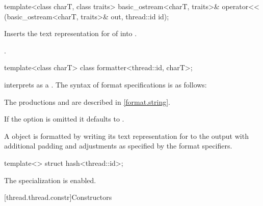 %
\begin{itemdecl}
template<class charT, class traits>
  basic_ostream<charT, traits>&
    operator<< (basic_ostream<charT, traits>& out, thread::id id);
\end{itemdecl}

\begin{itemdescr}
\pnum
\effects
Inserts the text representation for  of  into
.

\pnum
\returns
{}.
\end{itemdescr}

%
\begin{itemdecl}
template<class charT> class formatter<thread::id, charT>;
\end{itemdecl}

\begin{itemdescr}
\pnum
{} interprets 
as a .
The syntax of format specifications is as follows:

\begin{ncbnf}
\br
     
\end{ncbnf}

\begin{note}
The productions  and 
are described in \ref{format.string}.
\end{note}

\pnum
If the  option is omitted it defaults to \tcode{>}.

\pnum
A  object is formatted by
writing its text representation for  to the output
with additional padding and adjustments as specified by the format specifiers.
\end{itemdescr}

%
\begin{itemdecl}
template<> struct hash<thread::id>;
\end{itemdecl}

\begin{itemdescr}
\pnum
The specialization is enabled.
\end{itemdescr}

[thread.thread.constr]{Constructors}

